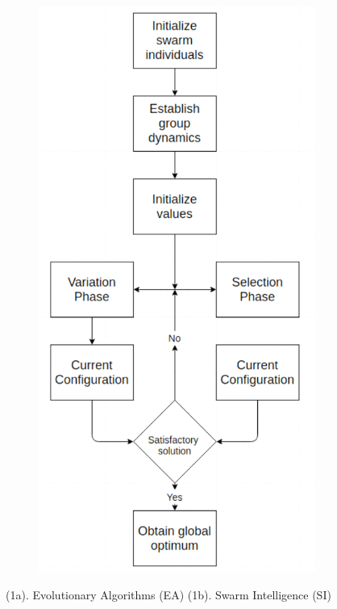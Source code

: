 \documentclass[conference]{IEEEtran}
\begin{document}
\begin{figure}[t]
\begin{subfigure}{.16\textwidth}
	\end{subfigure}
	\begin{subfigure}{.22\textwidth}
		\includegraphics[width=\textwidth]{si.png}
		
	\end{subfigure}
	\caption{(1a). Evolutionary Algorithms (EA)  (1b). Swarm Intelligence (SI)}
	\label{fig:comp}
\end{figure}
\vspace{-0.1cm}
\end{document}
